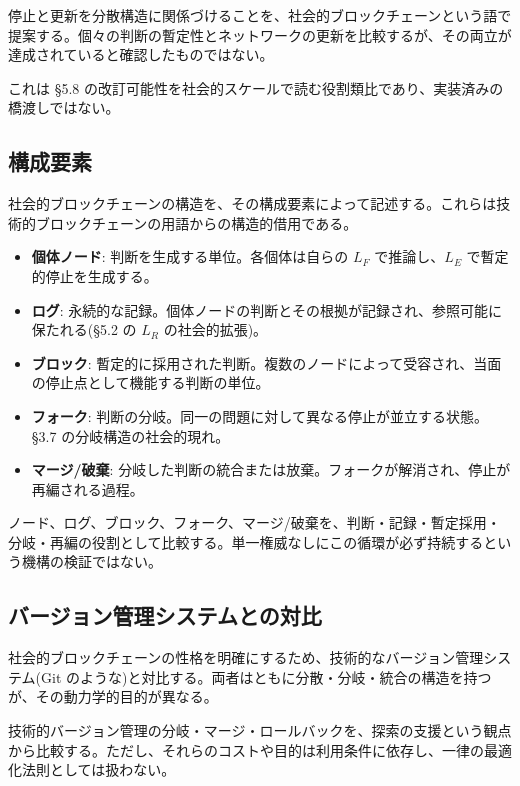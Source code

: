 停止と更新を分散構造に関係づけることを、社会的ブロックチェーンという語で提案する。個々の判断の暫定性とネットワークの更新を比較するが、その両立が達成されていると確認したものではない。

これは \S{}5.8 の改訂可能性を社会的スケールで読む役割類比であり、実装済みの橋渡しではない。

\bigskip


\subsection{構成要素}


社会的ブロックチェーンの構造を、その構成要素によって記述する。これらは技術的ブロックチェーンの用語からの構造的借用である。

\begin{itemize}
\item \textbf{個体ノード}: 判断を生成する単位。各個体は自らの $L_F$ で推論し、$L_E$ で暫定的停止を生成する。
\item \textbf{ログ}: 永続的な記録。個体ノードの判断とその根拠が記録され、参照可能に保たれる(\S{}5.2 の $L_R$ の社会的拡張)。
\item \textbf{ブロック}: 暫定的に採用された判断。複数のノードによって受容され、当面の停止点として機能する判断の単位。
\item \textbf{フォーク}: 判断の分岐。同一の問題に対して異なる停止が並立する状態。\S{}3.7 の分岐構造の社会的現れ。
\item \textbf{マージ/破棄}: 分岐した判断の統合または放棄。フォークが解消され、停止が再編される過程。
\end{itemize}


ノード、ログ、ブロック、フォーク、マージ/破棄を、判断・記録・暫定採用・分岐・再編の役割として比較する。単一権威なしにこの循環が必ず持続するという機構の検証ではない。

\bigskip


\subsection{バージョン管理システムとの対比}


社会的ブロックチェーンの性格を明確にするため、技術的なバージョン管理システム(Git のような)と対比する。両者はともに分散・分岐・統合の構造を持つが、その動力学的目的が異なる。

技術的バージョン管理の分岐・マージ・ロールバックを、探索の支援という観点から比較する。ただし、それらのコストや目的は利用条件に依存し、一律の最適化法則としては扱わない。

